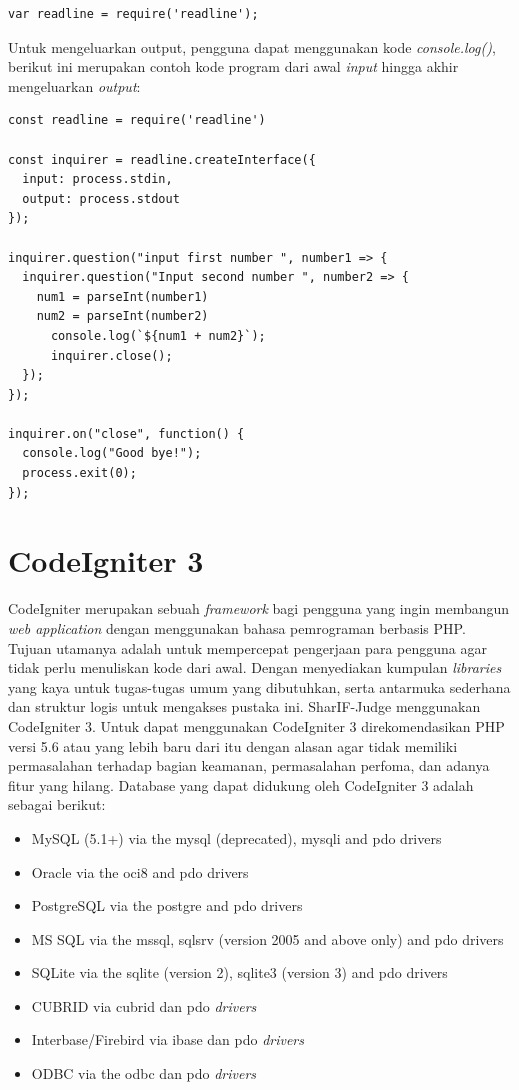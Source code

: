     \begin{lstlisting}[basicstyle=\ttfamily, frame=single,
    columns=fullflexible, breaklines=true, numbers=none]
var readline = require('readline');
    \end{lstlisting}
Untuk mengeluarkan output, pengguna dapat menggunakan kode \textit{console.log()}, berikut ini merupakan contoh kode program dari awal \textit{input} hingga akhir mengeluarkan \textit{output}: 
    \begin{lstlisting}[basicstyle=\ttfamily, frame=single,
    columns=fullflexible, breaklines=true, numbers=none]
const readline = require('readline')

const inquirer = readline.createInterface({
  input: process.stdin,
  output: process.stdout
});

inquirer.question("input first number ", number1 => {
  inquirer.question("Input second number ", number2 => {
    num1 = parseInt(number1)
    num2 = parseInt(number2)
      console.log(`${num1 + num2}`);
      inquirer.close();
  });
});

inquirer.on("close", function() {
  console.log("Good bye!");
  process.exit(0);
});
    \end{lstlisting}
    
\section{CodeIgniter 3}
\label{sec:CodeIgniter} 
 
CodeIgniter merupakan sebuah \textit{framework} bagi pengguna yang ingin membangun \textit{web application} dengan menggunakan bahasa pemrograman berbasis PHP\cite{codeigniter}. Tujuan utamanya adalah untuk mempercepat pengerjaan para pengguna agar tidak perlu menuliskan kode dari awal. Dengan menyediakan kumpulan \textit{libraries} yang kaya untuk tugas-tugas umum yang dibutuhkan, serta antarmuka sederhana dan struktur logis untuk mengakses pustaka ini. SharIF-Judge menggunakan CodeIgniter 3. Untuk dapat menggunakan CodeIgniter 3 direkomendasikan PHP versi 5.6 atau yang lebih baru dari itu dengan alasan agar tidak memiliki permasalahan terhadap bagian keamanan, permasalahan perfoma, dan adanya fitur yang hilang. Database yang dapat didukung oleh CodeIgniter 3 adalah sebagai berikut:
\begin{itemize}
    \item MySQL (5.1+) via the mysql (deprecated), mysqli and pdo drivers
    \item Oracle via the oci8 and pdo drivers
    \item PostgreSQL via the postgre and pdo drivers
    \item MS SQL via the mssql, sqlsrv (version 2005 and above only) and pdo drivers
    \item SQLite via the sqlite (version 2), sqlite3 (version 3) and pdo drivers
    \item CUBRID via cubrid dan pdo \textit{drivers}
    \item Interbase/Firebird via ibase dan pdo \textit{drivers}
    \item ODBC via the odbc dan pdo \textit{drivers} 
\end{itemize}

